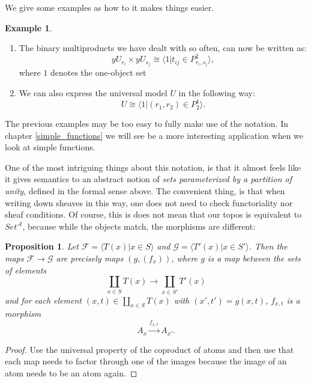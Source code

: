 \documentclass[a4paper]{amsproc}
\theoremstyle{plain}
\newtheorem{proposition}[theorem]{Proposition}
\theoremstyle{definition}
\newtheorem{example}[theorem]{Example}
\theoremstyle{remark}
\numberwithin{equation}{section}
\begin{document}
We give some examples as how to it makes things easier. 

\begin{example}
    \begin{enumerate}
        \item The binary multiproducts we have dealt with so often, can now be written as:
        \[ y U_{r_i} \times y U_{s_j} \cong \langle 1 | t_{ij} \in P^2_{r_i,s_j} \rangle, \] %
        where $1$ denotes the one-object set
        \item We can also express the universal model $U$ in the following way:
        \[ U \cong \langle 1 | (r_1,r_2) \in P^1_2 \rangle. \]

    \end{enumerate}
\end{example}

The previous examples may be too easy to fully make use of the notation. In chapter \ref{simple_functions} we will see be a more interesting application when we look at simple functions.

One of the most intriguing things about this notation, is that it almost feels like it gives semantics to an abstract notion of \emph{sets parameterized by a partition of unity}, defined in the formal sense above. The convenient thing, is that when writing down sheaves in this way, one does not need to check functoriality nor sheaf conditions. Of course, this is does not mean that our topos is equivalent to $Set^{\mathcal{A}}$, because while the objects match, the morphisms are different:

\begin{proposition}\label{atom_coprod_maps}
    Let $\mathcal{F} = \langle T(x) | x \in S \rangle$ and $\mathcal{G} = \langle T'(x) | x \in S' \rangle $. Then the maps $\mathcal{F} \to \mathcal{G}$ are precisely maps $(g, (f_x))$, where $g$ is a map between the sets of elements
    \[
        \coprod_{x \in S} T(x) \to \coprod_{x \in S'} T'(x)
    \]
    and for each element $(x,t) \in \coprod_{x \in S} T(x)$ with $(x',t') = g(x,t)$, $f_{x,t}$ is a morphism
    \[
        A_x \xrightarrow{f_{x,t}} A_{x'} .
    \]
\end{proposition}
\begin{proof}
    Use the universal property of the coproduct of atoms and then use that each map needs to factor through one of the images because the image of an atom needs to be an atom again.
\end{proof}
\end{document}
